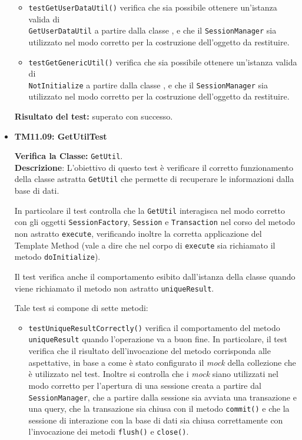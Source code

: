 \begin{itemize}
\begin{itemize}
\item \texttt{testGetUserDataUtil()} verifica che sia possibile ottenere un'istanza valida di \\ \texttt{GetUserDataUtil} a partire dalla classe , e che il \texttt{SessionManager} sia utilizzato nel modo corretto per la costruzione dell'oggetto da restituire.

\item \texttt{testGetGenericUtil()} verifica che sia possibile ottenere un'istanza valida di \\ \texttt{NotInitialize} a partire dalla classe , e che il \texttt{SessionManager} sia utilizzato nel modo corretto per la costruzione dell'oggetto da restituire.

\end{itemize}
\textbf{Risultato del test:} superato con successo.

\item[\passed] \textbf{TM11.09: GetUtilTest} 

\textbf{Verifica la Classe:} \texttt{GetUtil}.\\
\textbf{Descrizione}: L'obiettivo di questo test è verificare il corretto funzionamento della classe astratta \texttt{GetUtil} che permette di recuperare le informazioni dalla base di dati.

In particolare il test controlla che la \texttt{GetUtil} interagisca nel modo corretto con gli oggetti \texttt{SessionFactory}, \texttt{Session} e \texttt{Transaction} nel corso del metodo non astratto \texttt{execute}, verificando inoltre la corretta applicazione del  Template Method (vale a dire che nel corpo di \texttt{execute} sia richiamato il metodo \texttt{doInitialize}).

Il test verifica anche il comportamento esibito dall'istanza della classe quando viene richiamato il metodo non astratto \texttt{uniqueResult}.

Tale test si compone di sette metodi:
\begin{itemize}
\item \texttt{testUniqueResultCorrectly()} verifica il comportamento del metodo \texttt{uniqueResult} quando l'operazione va a buon fine. In particolare, il test verifica che il risultato dell'invocazione del metodo corrisponda alle aspettative, in base a come è stato configurato il \textit{mock} della collezione che è utilizzato nel test.
Inoltre si controlla che i \textit{mock} siano utilizzati nel modo corretto per l'apertura di una sessione creata a partire dal \texttt{SessionManager}, che a partire dalla sessione sia avviata una transazione e una query, che la transazione sia chiusa con il metodo \texttt{commit()} e che la sessione di interazione con la base di dati sia chiusa correttamente con l'invocazione dei metodi \texttt{flush()} e \texttt{close()}. 


\end{itemize}
\end{itemize}
